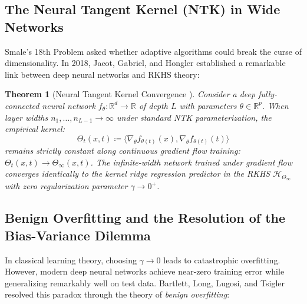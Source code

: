 \documentclass[11pt,a4paper]{article}
\newtheorem{theorem}{Theorem}[section]
\theoremstyle{definition}
\begin{document}
\subsection{The Neural Tangent Kernel (NTK) in Wide Networks}

Smale's 18th Problem asked whether adaptive algorithms could break the curse of dimensionality.
In 2018, Jacot, Gabriel, and Hongler \cite{jacot2018} established a remarkable link between deep neural networks and RKHS theory:

\begin{theorem}[Neural Tangent Kernel Convergence \cite{jacot2018}]\label{thm:ntk}
Consider a deep fully-connected neural network $f_\theta: \mathbb{R}^d \to \mathbb{R}$ of depth $L$ with parameters $\theta \in \mathbb{R}^p$. When layer widths $n_1, \dots, n_{L-1} \to \infty$ under standard NTK parameterization, the empirical kernel:
\begin{equation}\label{eq:empirical_ntk}
\Theta_t(x, t) \coloneqq \langle \nabla_\theta f_{\theta(t)}(x), \nabla_\theta f_{\theta(t)}(t) \rangle
\end{equation}
remains strictly constant along continuous gradient flow training: $\Theta_t(x, t) \to \Theta_\infty(x, t)$.
The infinite-width network trained under gradient flow converges identically to the kernel ridge regression predictor in the RKHS $\mathcal{H}_{\Theta_\infty}$ with zero regularization parameter $\gamma \to 0^+$.
\end{theorem}

\subsection{Benign Overfitting and the Resolution of the Bias-Variance Dilemma}

In classical learning theory, choosing $\gamma \to 0$ leads to catastrophic overfitting. However, modern deep neural networks achieve near-zero training error while generalizing remarkably well on test data.
Bartlett, Long, Lugosi, and Tsigler \cite{bartlett2020} resolved this paradox through the theory of \emph{benign overfitting}:
\end{document}

